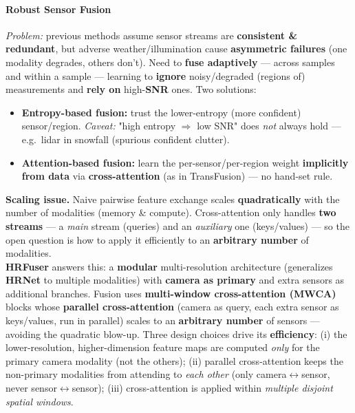 \documentclass{article}
\begin{document}
\paragraph{Robust Sensor Fusion}
\textit{Problem:} previous methods assume sensor streams are \textbf{consistent \& redundant}, but adverse weather/illumination cause \textbf{asymmetric failures} (one modality degrades, others don't). Need to \textbf{fuse adaptively} --- across samples and within a sample --- learning to \textbf{ignore} noisy/degraded (regions of) measurements and \textbf{rely on} high-\textbf{SNR} ones. Two solutions:
\begin{itemize}
    \item \textbf{Entropy-based fusion:} trust the lower-entropy (more confident) sensor/region. \textit{Caveat:} "high entropy $\Rightarrow$ low SNR" does \textit{not} always hold --- e.g.\ lidar in snowfall (spurious confident clutter).
    \item \textbf{Attention-based fusion:} learn the per-sensor/per-region weight \textbf{implicitly from data} via \textbf{cross-attention} (as in TransFusion) --- no hand-set rule.
\end{itemize}
\textbf{Scaling issue.} Naive pairwise feature exchange scales \textbf{quadratically} with the number of modalities (memory \& compute). Cross-attention only handles \textbf{two streams} --- a \textit{main} stream (queries) and an \textit{auxiliary} one (keys/values) --- so the open question is how to apply it efficiently to an \textbf{arbitrary number} of modalities.\\

\textbf{HRFuser} answers this: a \textbf{modular} multi-resolution architecture (generalizes \textbf{HRNet} to multiple modalities) with \textbf{camera as primary} and extra sensors as additional branches. Fusion uses \textbf{multi-window cross-attention (MWCA)} blocks whose \textbf{parallel cross-attention} (camera as query, each extra sensor as keys/values, run in parallel) scales to an \textbf{arbitrary number} of sensors --- avoiding the quadratic blow-up. Three design choices drive its \textbf{efficiency}: (i) the lower-resolution, higher-dimension feature maps are computed \textit{only} for the primary camera modality (not the others); (ii) parallel cross-attention keeps the non-primary modalities from attending to \textit{each other} (only camera$\leftrightarrow$sensor, never sensor$\leftrightarrow$sensor); (iii) cross-attention is applied within \textit{multiple disjoint spatial windows}.
\end{document}
